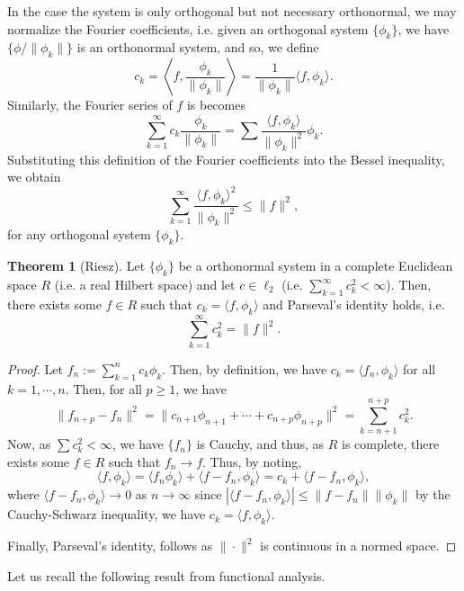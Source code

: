 \documentclass[]{article}
\theoremstyle{definition}
\newtheorem{theorem}{Theorem}
\theoremstyle{definition}
\begin{document}
In the case the system is only orthogonal but not necessary orthonormal, we may 
normalize the Fourier coefficients, i.e. given an orthogonal system \(\{\phi_k\}\), 
we have \(\{\phi / \|\phi_k\|\}\) is an orthonormal system, and so, we define
\[c_k = \left\langle f, \frac{\phi_k}{\|\phi_k\|} \right\rangle = \frac{1}{\|\phi_k\|} \langle f, \phi_k \rangle.\]
Similarly, the Fourier series of \(f\) is becomes 
\[\sum_{k = 1}^\infty c_k \frac{\phi_k}{\|\phi_k\|} = \sum \frac{\langle f, \phi_k\rangle}{\|\phi_k\|^2} \phi_k.\]
Substituting this definition of the Fourier coefficients into the Bessel inequality,
we obtain 
\[\sum_{k = 1}^\infty \frac{\langle f, \phi_k\rangle^2}{\|\phi_k\|^2} \le \|f\|^2,\]
for any orthogonal system \(\{\phi_k\}\).

\begin{theorem}[Riesz]
  Let \(\{\phi_k\}\) be a orthonormal system in a complete Euclidean space \(R\) 
  (i.e. a real Hilbert space) and let \(c \in \ell_2\) 
  (i.e. \(\sum_{k = 1}^\infty c_k^2 < \infty\)). Then, 
  there exists some \(f \in R\) such that \(c_k = \langle f, \phi_k \rangle\) and 
  Parseval's identity holds, i.e.
  \[\sum_{k = 1}^\infty c_k^2 = \|f\|^2.\]
\end{theorem}
\begin{proof}
  Let \(f_n := \sum_{k = 1}^n c_k \phi_k\). Then, by definition, we have 
  \(c_k = \langle f_n, \phi_k \rangle\) for all \(k = 1, \cdots, n\). Then, 
  for all \(p \ge 1\), we have
  \[\|f_{n + p} - f_n\|^2 = \|c_{n + 1} \phi_{n + 1} + \cdots + c_{n + p} \phi_{n + p}\|^2 
    = \sum_{k = n + 1}^{n + p} c_k^2.\]
  Now, as \(\sum c_k^2 < \infty\), we have \(\{f_n\}\) is Cauchy, and thus, as 
  \(R\) is complete, there exists some \(f \in R\) such that \(f_n \to f\). 
  Thus, by noting, 
  \[\langle f, \phi_k \rangle = \langle f_n \phi_k\rangle + \langle f - f_n, \phi_k\rangle
    = c_k + \langle f - f_n, \phi_k\rangle,\]
  where \(\langle f - f_n, \phi_k\rangle \to 0\) as \(n \to \infty\) since 
  \(|\langle f - f_n, \phi_k\rangle| \le \|f - f_n\| \|\phi_k\|\) by the 
  Cauchy-Schwarz inequality, we have \(c_k = \langle f, \phi_k\rangle\).

  Finally, Parseval's identity, follows as \(\|\cdot\|^2\) is continuous in a 
  normed space.
\end{proof}

Let us recall the following result from functional analysis.
\end{document}
